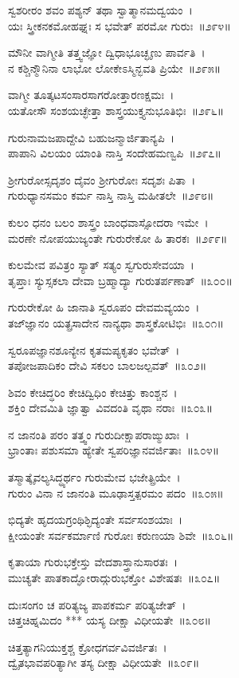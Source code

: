 ಸ್ವಶರೀರಂ ಶವಂ ಪಶ್ಯನ್ ತಥಾ ಸ್ವಾತ್ಮಾನಮದ್ವಯಂ~।\\
ಯಃ ಸ್ತ್ರೀಕನಕಮೋಹಘ್ನಃ ಸ ಭವೇತ್ ಪರಮೋ ಗುರುಃ~॥೨೯೪॥

ಮೌನೀ ವಾಗ್ಮೀತಿ ತತ್ತ್ವಜ್ಞೋ ದ್ವಿಧಾಭೂಚ್ಛೃಣು ಪಾರ್ವತಿ~।\\
ನ ಕಶ್ಚಿನ್ಮೌನಿನಾ ಲಾಭೋ ಲೋಕೇಽಸ್ಮಿನ್ಭವತಿ ಪ್ರಿಯೇ~॥೨೯೫॥

ವಾಗ್ಮೀ ತೂತ್ಕಟಸಂಸಾರಸಾಗರೋತ್ತಾರಣಕ್ಷಮಃ~।\\
ಯತೋಸೌ ಸಂಶಯಚ್ಛೇತ್ತಾ ಶಾಸ್ತ್ರಯುಕ್ತ್ಯನುಭೂತಿಭಿಃ~॥೨೯೬॥

ಗುರುನಾಮಜಪಾದ್ದೇವಿ ಬಹುಜನ್ಮಾರ್ಜಿತಾನ್ಯಪಿ~।\\
ಪಾಪಾನಿ ವಿಲಯಂ ಯಾಂತಿ ನಾಸ್ತಿ ಸಂದೇಹಮಣ್ವಪಿ~॥೨೯೭॥

ಶ್ರೀಗುರೋಸ್ಸದೃಶಂ ದೈವಂ ಶ್ರೀಗುರೋಃ ಸದೃಶಃ ಪಿತಾ~।\\
ಗುರುಧ್ಯಾನಸಮಂ ಕರ್ಮ ನಾಸ್ತಿ ನಾಸ್ತಿ ಮಹೀತಲೇ~॥೨೯೮॥

ಕುಲಂ ಧನಂ ಬಲಂ ಶಾಸ್ತ್ರಂ ಬಾಂಧವಾಸ್ಸೋದರಾ ಇಮೇ~।\\
ಮರಣೇ ನೋಪಯುಜ್ಯಂತೇ ಗುರುರೇಕೋ ಹಿ ತಾರಕಃ~॥೨೯೯॥

ಕುಲಮೇವ ಪವಿತ್ರಂ ಸ್ಯಾತ್ ಸತ್ಯಂ ಸ್ವಗುರುಸೇವಯಾ~।\\
ತೃಪ್ತಾಃ ಸ್ಯುಸ್ಸಕಲಾ ದೇವಾ ಬ್ರಹ್ಮಾದ್ಯಾ ಗುರುತರ್ಪಣಾತ್~॥೩೦೦॥

ಗುರುರೇಕೋ ಹಿ ಜಾನಾತಿ ಸ್ವರೂಪಂ ದೇವಮವ್ಯಯಂ~।\\
ತಜ‌್‌ಜ್ಞಾನಂ ಯತ್ಪ್ರಸಾದೇನ ನಾನ್ಯಥಾ ಶಾಸ್ತ್ರಕೋಟಿಭಿಃ~॥೩೦೧॥

ಸ್ವರೂಪಜ್ಞಾನಶೂನ್ಯೇನ ಕೃತಮಪ್ಯಕೃತಂ ಭವೇತ್~।\\
ತಪೋಜಪಾದಿಕಂ ದೇವಿ ಸಕಲಂ ಬಾಲಜಲ್ಪವತ್~॥೩೦೨॥

ಶಿವಂ ಕೇಚಿದ್ಧರಿಂ ಕೇಚಿದ್ವಿಧಿಂ ಕೇಚಿತ್ತು ಕಾಂಶ್ಚನ~।\\
ಶಕ್ತಿಂ ದೇವಮಿತಿ ಜ್ಞಾತ್ವಾ ವಿವದಂತಿ ವೃಥಾ ನರಾಃ~॥೩೦೩॥

ನ ಜಾನಂತಿ ಪರಂ ತತ್ತ್ವಂ ಗುರುದೀಕ್ಷಾಪರಾಙ್ಮುಖಾಃ~।\\
ಭ್ರಾಂತಾಃ ಪಶುಸಮಾ ಹ್ಯೇತೇ ಸ್ವಪರಿಜ್ಞಾನವರ್ಜಿತಾಃ~॥೩೦೪॥

ತಸ್ಮಾತ್ಕೈವಲ್ಯಸಿದ್ಧ್ಯರ್ಥಂ ಗುರುಮೇವ ಭಜೇತ್ಪ್ರಿಯೇ~।\\
ಗುರುಂ ವಿನಾ ನ ಜಾನಂತಿ ಮೂಢಾಸ್ತತ್ಪರಮಂ ಪದಂ~॥೩೦೫॥

ಭಿದ್ಯತೇ ಹೃದಯಗ್ರಂಥಿಶ್ಛಿದ್ಯಂತೇ ಸರ್ವಸಂಶಯಾಃ~।\\
ಕ್ಷೀಯಂತೇ ಸರ್ವಕರ್ಮಾಣಿ ಗುರೋಃ ಕರುಣಯಾ ಶಿವೇ~॥೩೦೬॥

ಕೃತಾಯಾ ಗುರುಭಕ್ತೇಸ್ತು ವೇದಶಾಸ್ತ್ರಾನುಸಾರತಃ~।\\
ಮುಚ್ಯತೇ ಪಾತಕಾದ್ಘೋರಾದ್ಗುರುಭಕ್ತೋ ವಿಶೇಷತಃ~॥೩೦೭॥

ದುಃಸಂಗಂ ಚ ಪರಿತ್ಯಜ್ಯ ಪಾಪಕರ್ಮ ಪರಿತ್ಯಜೇತ್~।\\
ಚಿತ್ತಚಿಹ್ನಮಿದಂ *** ಯಸ್ಯ ದೀಕ್ಷಾ ವಿಧೀಯತೇ~॥೩೦೮॥

ಚಿತ್ತತ್ಯಾಗನಿಯುಕ್ತಶ್ಚ ಕ್ರೋಧಗರ್ವವಿವರ್ಜಿತಃ~।\\
ದ್ವೈತಭಾವಪರಿತ್ಯಾಗೀ ತಸ್ಯ ದೀಕ್ಷಾ ವಿಧೀಯತೇ~॥೩೦೯॥

